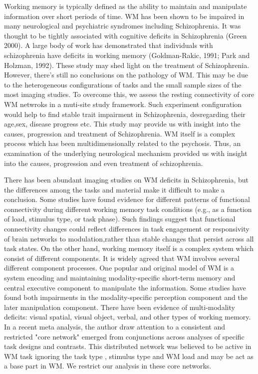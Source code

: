 \documentclass[preprint,authoryear,review,12pt]{elsarticle}
\begin{document}
Working memory is typically defined as the ability to maintain and manipulate information over short periods of time. WM has been shown to be impaired in many neurological and psychiatric syndromes including Schizophrenia. It was thought to be tightly associated with cognitive deficits in Schizophrenia (Green 2000). A large body of work has demonstrated that individuals with schizophrenia have deficits in working memory (Goldman-Rakic, 1991; Park and Holzman, 1992). These study may shed light on the treatment of Schizophrenia. However, there's still no conclusions on the pathology of WM. This may be due to the heterogeneous configurations of tasks and the small sample sizes of the most imaging studies. To overcome this, we assess the resting connectivity of core WM netwroks in a muti-site study framework. Such experiment configuration would help to find stable trait impairment in Schizophrenia, desregarding their age,sex, disease progress etc. This study may provide us with insight into the causes, progression and treatment of Schizophrenia. WM itself is a complex process which has been multidimensionally related to the psychosis. Thus, an examination of the underlying neurological mechanism provided us with insight into the causes, progression and even treatment of schizophrenia. 

There has been abundant imaging studies on WM deficits in Schizophrenia, but the differences among the tasks and material make it difficult to make a conclusion.  Some studies have found evidence for different patterns of functional connectivity during different working memory task conditions (e.g., as a function of load, stimulus type, or task phase). Such findings suggest that functional connectivity changes could reflect differences in task engagement or responsivity of brain networks to modulation,rather than stable changes that persist across all task states. On the other hand, working memory itself is a complex system which consist of different components. It is widely agreed that WM involves several different component processes. One popular and original model of WM is a system encoding and maintaining modality-specific short-term memory and central executive component to manipulate the information. Some studies have found both impairments in the modality-specific perception component and the later manipulation component. There have been evidence of multi-modality deficits: visual spatial, visual object, verbal, and other types of working memory. In a recent meta analysis, the author draw attention to a consistent and restricted "core network" emerged from conjunctions across analyses of specific task designs and contrasts. This distributed network was believed to be active in WM task ignoring the task type , stimulus type and WM load and may be act as a base part in WM. We restrict our analysis in these core networks.
\end{document}
